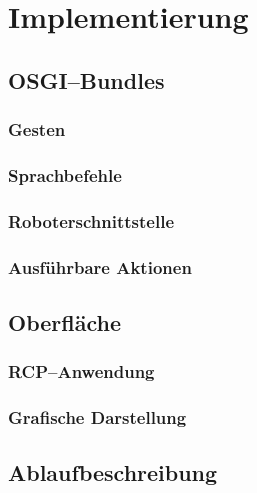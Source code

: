 \chapter{Implementierung}
\label{chap:Implementierung}

\section{OSGI--Bundles}
\subsection{Gesten}
\subsection{Sprachbefehle}
\subsection{Roboterschnittstelle}
\label{subsec:Roboterschnittstelle}
\subsection{Ausf\"uhrbare Aktionen}

\section{Oberfl\"ache}
\subsection{RCP--Anwendung}
\subsection{Grafische Darstellung}

\section{Ablaufbeschreibung}
